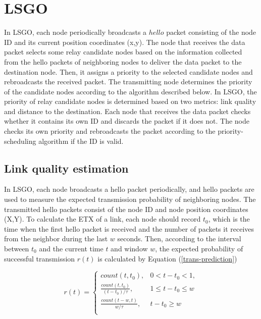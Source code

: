 \documentclass[conference]{IEEEtran}
\begin{document}
\section{LSGO}
\label{LSGO}

In LSGO, each node periodically broadcasts a $hello$ packet consisting of the node ID and its current position coordinates (x,y). 
The node that receives the data packet  selects some relay candidate nodes based on the  information collected from the hello packets  of neighboring nodes to deliver the data packet to the destination node. 
Then, it assigns a priority to the selected candidate nodes and rebroadcasts the received packet. 
The transmitting node  determines the priority of the candidate nodes according to  the algorithm described below. 
In LSGO, the priority of relay candidate nodes is determined based on two metrics: link quality and distance to the destination. 
Each node that receives the data packet checks whether it contains its own ID and discards the packet if it does not.
The node checks its own priority and rebroadcasts the packet according to the priority-scheduling algorithm if the ID  is valid.


\subsection{Link quality estimation}

  In LSGO, each node broadcasts a hello packet periodically, and hello packets are used to measure the expected transmission probability of neighboring nodes. The transmitted hello packets consist of the node ID and node position coordinates (X,Y). To calculate the ETX of a link, each node should record $t_{0}$, which is the time when the first hello packet is received and the number of packets it receives from the neighbor during the last $w$ seconds. Then, according to the interval between $t_{0}$ and the current time $t$ and window $w$, the expected probability of successful transmission $r(t)$ is calculated by Equation (\ref{trans-prediction})

\begin{equation}
\label{trans-prediction}
r(t) =\begin{cases}count(t, t_{0}), & 0 < t - t_{0} < 1,  \\ \frac{count(t,t_{0})}{(t-t_{0}) / \tau}, & 1 \leq t - t_{0} \leq w\\
\frac{count(t - w,t)}{w / \tau}, &  t - t_{0} \geq w\\
\end{cases}
\end{equation}
\end{document}
